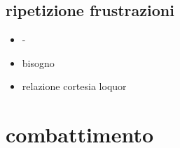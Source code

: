 \subsection{ripetizione frustrazioni}

\begin{itemize}

\item {}-

\item {} bisogno

\item relazione cortesia loquor

\end{itemize}


\section{combattimento}

